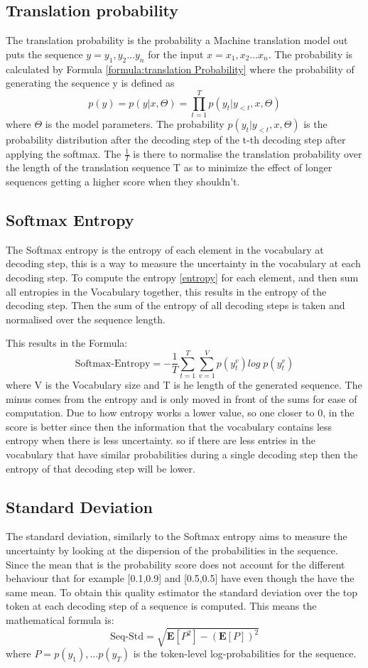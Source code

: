 \subsection{Translation probability}
The translation probability is the probability a Machine translation model out puts the sequence $y = y_1, y_2 \dots y_n$ for the input $x=x_1, x_2 \dots x_n$. The probability is calculated by Formula \autoref{formula:translation Probability} where the probability of generating the sequence y is defined as $$ p(y)=p(y|x,\Theta)=\prod_{t=1}^T p(y_t|y_{<t}, x, \Theta)$$ where $\Theta$ is the model parameters.
The probability $p(y_t|y_{<t}, x,\Theta)$ is the probability distribution after the decoding step of the t-th decoding step after applying the softmax.
The $\frac{1}{T}$ is there to normalise the translation probability over the length of the translation sequence T as to minimize the effect of longer sequences getting a higher score when they shouldn't. 


\subsection{Softmax Entropy}\label{sect:entropy}
The Softmax entropy is the entropy of each element in the vocabulary at decoding step, this is a way to measure the uncertainty in the vocabulary at each decoding step.
To compute the entropy \autoref{entropy} for each element, and then sum all entropies in the Vocabulary together, this results in the entropy of the decoding step. 
Then the sum of the entropy of all decoding steps is taken and normalised over the sequence length. 

This results in the Formula:
$$\text{Softmax-Entropy}=-\frac{1}{T}\sum_{t=1}^T\sum_{v=1}^V p(y_t^v)log\; p(y_t^v) \label{formula:translation entropy}$$ where V is the Vocabulary size and T is he length of the generated sequence. The minus comes from the entropy and is only moved in front of the sums for ease of computation.
Due to how entropy works a lower value, so one closer to 0, in the score is better since then the information that the vocabulary contains less entropy when there is less uncertainty. so if there are less entries in the vocabulary that have similar probabilities during a single decoding step then the entropy of that decoding step will be lower.

\subsection{Standard Deviation}\label{sect:stddiv}
The standard deviation, similarly to the Softmax entropy aims to measure the uncertainty by looking at the dispersion of the probabilities in the sequence. 
Since the mean that is the probability score does not account for the different behaviour that for example [0.1,0.9] and [0.5,0.5] have even though the have the same mean. 
To obtain this quality estimator the standard deviation over the top token at each decoding step of a sequence is computed.
This means the mathematical formula is: $$\text{Seq-Std}=\sqrt{\mathbf{E}[P^2]-(\mathbf{E}[P])^2}$$ where $P=p(y_1) , \dots p(y_T)$ is the token-level log-probabilities for the sequence.

